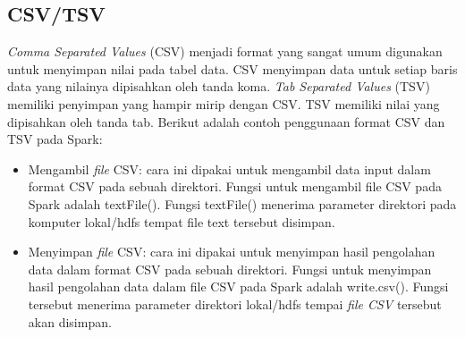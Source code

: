 \subsection{CSV/TSV}
\label{theory:csv}
\textit{Comma Separated Values} (CSV) menjadi format yang sangat umum digunakan untuk menyimpan nilai pada tabel data. CSV menyimpan data untuk setiap baris data yang nilainya dipisahkan oleh tanda koma. \textit{Tab Separated Values} (TSV) memiliki penyimpan yang hampir mirip dengan CSV. TSV memiliki nilai yang dipisahkan oleh tanda tab. Berikut adalah contoh penggunaan format CSV dan TSV pada Spark:

\begin{itemize}

\item Mengambil \textit{file} CSV: cara ini dipakai untuk mengambil data input dalam format CSV pada sebuah direktori. Fungsi untuk mengambil file CSV pada Spark adalah \textsf{textFile()}. Fungsi textFile() menerima parameter direktori pada komputer lokal/hdfs tempat file text tersebut disimpan. 


\item Menyimpan \textit{file} CSV: cara ini dipakai untuk menyimpan hasil pengolahan data dalam format CSV pada sebuah direktori. Fungsi untuk menyimpan hasil pengolahan data dalam file CSV pada Spark adalah \textsf{write.csv()}. Fungsi tersebut menerima parameter direktori lokal/hdfs tempai \textit{file CSV} tersebut akan disimpan.


\end{itemize}


